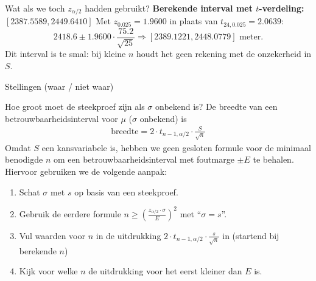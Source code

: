    \begin{frame}{Wat als we toch $z_{\alpha/2}$ hadden gebruikt?}
        \textbf{Berekende interval met $t$-verdeling:} $[2387.5589, 2449.6410]$ 
        \vfill
        Met $z_{0.025} = 1.9600$ in plaats van $t_{24,0.025} = 2.0639$:
        \[
            2418.6 \pm 1.9600 \cdot \frac{75.2}{\sqrt{25}} \Rightarrow [2389.1221, 2448.0779] \text{ meter.}
        \]
        \vfill\pause
        Dit interval is te smal: bij kleine $n$ houdt het geen rekening met de onzekerheid in $S$.
    \end{frame}

    \begin{frame}{Stellingen (waar / niet waar)}
    \end{frame}

    \begin{frame}{Hoe groot moet de steekproef zijn als $\sigma$ onbekend is?}
        De breedte van een betrouwbaarheidsinterval voor $\mu$ ($\sigma$ onbekend) is
        \begin{align*}
            \text{breedte} = 2 \cdot t_{n-1,\alpha/2} \cdot \frac{S}{\sqrt{n}}
        \end{align*}
        \vfill\pause
        Omdat $S$ een kansvariabele is, hebben we geen gesloten formule voor de minimaal benodigde $n$ om een betrouwbaarheidsinterval met foutmarge $\pm E$ te behalen.
        Hiervoor gebruiken we de volgende aanpak:
        \vfill
        \begin{enumerate}[<+->]\setlength\itemsep{1em}
            \item Schat $\sigma$ met $s$ op basis van een steekproef.
            \item Gebruik de eerdere formule $n \geq \left( \frac{z_{\alpha/2} \cdot \sigma}{E} \right)^2$ met \enquote{$\sigma = s$}.
            \item Vul waarden voor $n$ in de uitdrukking $2 \cdot t_{n-1,\alpha/2} \cdot \frac{s}{\sqrt{n}}$ in (startend bij berekende $n$)
            \item Kijk voor welke $n$ de uitdrukking voor het eerst kleiner dan $E$ is.
        \end{enumerate}
    \end{frame}

